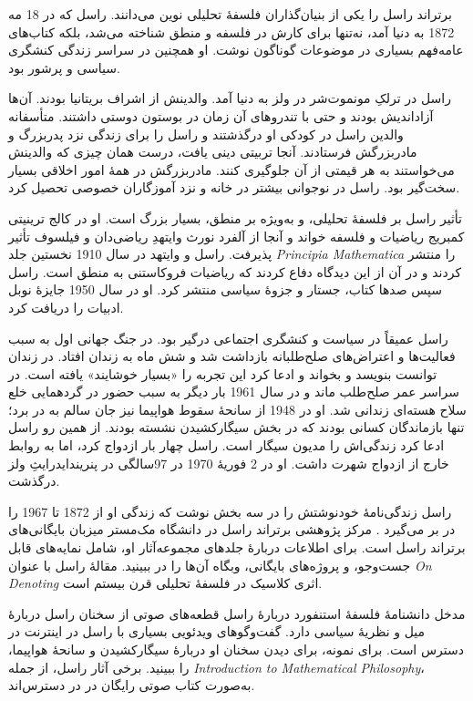 \documentclass[../../../include/open-logic-section]{subfiles}
\begin{document}



برتراند راسل را یکی از بنیان‌گذاران فلسفهٔ تحلیلی نوین می‌دانند. راسل
که در 18 مه 1872 به دنیا آمد، نه‌تنها برای کارش در فلسفه و منطق
شناخته می‌شد، بلکه کتاب‌های عامه‌فهم بسیاری در موضوعات گوناگون نوشت.
او همچنین در سراسر زندگی کنشگری سیاسی و پرشور بود.

راسل در ترلکِ مونموت‌شر در ولز به دنیا آمد. والدینش از اشراف بریتانیا
بودند. آن‌ها آزاداندیش بودند و حتی با تندروهای آن زمان در بوستون
دوستی داشتند. متأسفانه والدین راسل در کودکی او درگذشتند و راسل را برای
زندگی نزد پدربزرگ و مادربزرگش فرستادند. آنجا تربیتی دینی یافت، درست
همان چیزی که والدینش می‌خواستند به هر قیمتی از آن جلوگیری کنند.
مادربزرگش در همهٔ امور اخلاقی بسیار سخت‌گیر بود. راسل در نوجوانی بیشتر
در خانه و نزد آموزگاران خصوصی تحصیل کرد.

تأثیر راسل بر فلسفهٔ تحلیلی، و به‌ویژه بر منطق، بسیار بزرگ است. او در
کالج ترینیتی کمبریج ریاضیات و فلسفه خواند و آنجا از آلفرد نورث وایتهدِ
ریاضی‌دان و فیلسوف تأثیر پذیرفت. راسل و وایتهد در سال 1910 نخستین جلد
\emph{Principia Mathematica} را منتشر کردند و در آن از این دیدگاه دفاع
کردند که ریاضیات فروکاستنی به منطق است. راسل سپس صدها کتاب، جستار و
جزوهٔ سیاسی منتشر کرد. او در سال 1950 جایزهٔ نوبل ادبیات را دریافت کرد.

راسل عمیقاً در سیاست و کنشگری اجتماعی درگیر بود. در جنگ جهانی اول به
سبب فعالیت‌ها و اعتراض‌های صلح‌طلبانه بازداشت شد و شش ماه به زندان
افتاد. در زندان توانست بنویسد و بخواند و ادعا کرد این تجربه را «بسیار
خوشایند» یافته است. در سراسر عمر صلح‌طلب ماند و در سال 1961 بار دیگر
به سبب حضور در گردهمایی خلع سلاح هسته‌ای زندانی شد. او در 1948 از
سانحهٔ سقوط هواپیما نیز جان سالم به در برد؛ تنها بازماندگان کسانی
بودند که در بخش سیگارکشیدن نشسته بودند. از همین رو راسل ادعا کرد
زندگی‌اش را مدیون سیگار است. راسل چهار بار ازدواج کرد، اما به روابط
خارج از ازدواج شهرت داشت. او در 2 فوریهٔ 1970 در 97سالگی در
پنریندایدرایثِ ولز درگذشت.

\begin{reading}
راسل زندگی‌نامهٔ خودنوشتش را در سه بخش نوشت که زندگی او از 1872 تا
1967 را در بر می‌گیرد \citep{Russell1967,Russell1968,Russell1969}.
مرکز پژوهشی برتراند راسل در دانشگاه مک‌مستر میزبان بایگانی‌های برتراند
راسل است. برای اطلاعات دربارهٔ جلدهای مجموعه‌آثار او، شامل نمایه‌های
قابل جست‌وجو، و پروژه‌های بایگانی، وبگاه آن‌ها را در
\citet{Duncan2015} ببینید. مقالهٔ راسل با عنوان \emph{On Denoting}
\citep{Russell1905} اثری کلاسیک در فلسفهٔ تحلیلی قرن بیستم است.

مدخل دانشنامهٔ فلسفهٔ استنفورد دربارهٔ راسل \citep{Irvine2015}
قطعه‌های صوتی از سخنان راسل دربارهٔ میل و نظریهٔ سیاسی دارد. گفت‌وگوهای
ویدئویی بسیاری با راسل در اینترنت در دسترس است. برای نمونه، برای دیدن
سخنان او دربارهٔ سیگارکشیدن و سانحهٔ هواپیما، \citet{RussellND} را
ببینید. برخی آثار راسل، از جمله
\emph{Introduction to Mathematical Philosophy}، به‌صورت کتاب صوتی
رایگان در \citet{LibriVoxND} در دسترس‌اند.
\end{reading}
\end{document}
